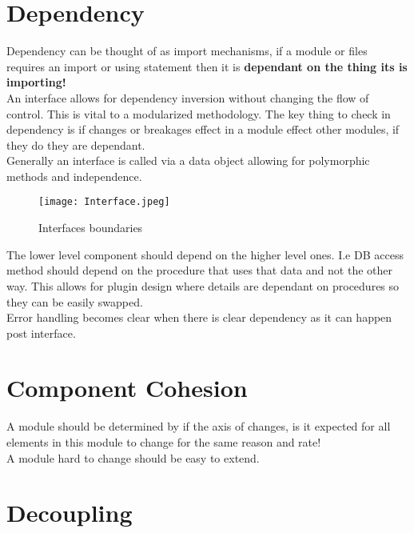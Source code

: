 \documentclass[11pt]{scrartcl} %
\begin{document}
\section{Dependency}

Dependency can be thought of as import mechanisms, if a module or files requires an import or using
statement then it is \textbf{dependant on the thing its is importing!}\\

An interface allows for dependency inversion without changing the flow of control. This is vital
to a modularized methodology. The key thing to check in dependency is if changes or breakages 
effect in a module effect other modules, if they do they are dependant.\\

Generally an interface is called via a data object allowing for polymorphic methods and independence.\\

\begin{figure}[h] %
	\centering
	\texttt{[image: Interface.jpeg]} %
	\caption{Interfaces boundaries}
\end{figure}

The lower level component should depend on the higher level ones. I.e DB access method should depend 
on the procedure that uses that data and not the other way. This allows for plugin design where details
are dependant on procedures so they can be easily swapped.\\

Error handling becomes clear when there is clear dependency as it can happen post interface.

\section{Component Cohesion}

A module should be determined by if the axis of changes, is it expected for all elements
in this module to change for the same reason and rate!\\

A module hard to change should be easy to extend.

\section{Decoupling}
\end{document}
